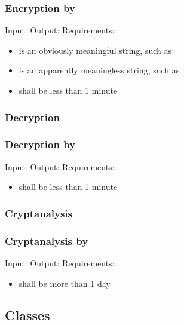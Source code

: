 \begin{frame}
\frametitle{Encryption by \alice}
Input: \encryptin \medskip
Output: \encryptout \medskip
Requirements:
\begin{itemize}
\item \plaintextarg{} is an obviously meaningful string,
  such as \plaintextex
\item \ciphertextarg{} is an apparently meaningless string,
  such as \ciphertextex
\item \encrypttime{} shall be less than 1 minute
\end{itemize}
\end{frame}

\subsubsection{Decryption}
\begin{frame}
\frametitle{Decryption by \bob}
Input: \decryptin \medskip
Output: \decryptout \medskip
Requirements:
\begin{itemize}
\item \decrypttime{} shall be less than 1 minute
\end{itemize}
\end{frame}

\subsubsection{Cryptanalysis}
\begin{frame}
\frametitle{Cryptanalysis by \eve}
Input: \cryptanalyzein \medskip
Output: \cryptanalyzeout \medskip
Requirements:
\begin{itemize}
\item \cryptanalyzetime{} shall be more than 1 day
\end{itemize}
\end{frame}


\subsection{Classes}
\lstset{language=C++} %
\newcommand{\csh}{../../../src/\cs/\cs.h}

\begin{frame}
\frametitle{}
\codes{}
\end{frame}

\begin{frame}
\codes{}
\end{frame}

